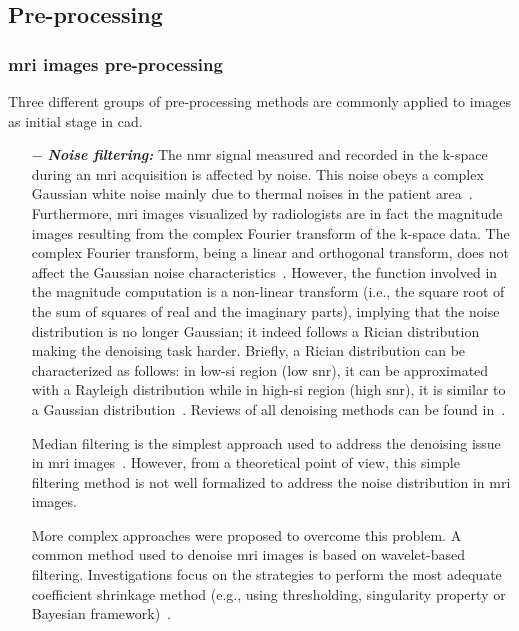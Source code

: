 \subsection{Pre-processing} \label{subsec:preprocessing}

\subsubsection{\ac{mri} images pre-processing}

Three different groups of pre-processing methods are commonly applied to images as initial stage in \ac{cad}.

\begin{enumerate}[leftmargin=*]

\item[$-$] \textbf{\textit{Noise filtering:}} The \ac{nmr} signal measured and recorded in the k-space during an \ac{mri} acquisition is affected by noise. This noise obeys a complex Gaussian white noise mainly due to thermal noises in the patient area~\cite{Nowak1999}. Furthermore, \ac{mri} images visualized by radiologists are in fact the magnitude images resulting from the complex Fourier transform of the k-space data. The complex Fourier transform, being a linear and orthogonal transform, does not affect the Gaussian noise characteristics~\cite{Nowak1999}. However, the function involved in the magnitude computation is a non-linear transform (i.e., the square root of the sum of squares of real and the imaginary parts), implying that the noise distribution is no longer Gaussian; it indeed follows a Rician distribution making the denoising task harder. Briefly, a Rician distribution can be characterized as follows: in low-\ac{si} region (low \ac{snr}), it can be approximated with a Rayleigh distribution while in high-\ac{si} region (high \ac{snr}), it is similar to a Gaussian distribution~\cite{Manjon2008}. Reviews of all denoising methods can be found in~\cite{Buades2005,Mohan2014}.

  Median filtering is the simplest approach used to address the denoising issue in \ac{mri} images~\cite{Ozer2009,Ozer2010}. However, from a theoretical point of view, this simple filtering method is not well formalized to address the noise distribution in \ac{mri} images.

  More complex approaches were proposed to overcome this problem. A common method used to denoise \ac{mri} images is based on wavelet-based filtering. Investigations focus on the strategies to perform the most adequate coefficient shrinkage method (e.g., using thresholding, singularity property or Bayesian framework)~\cite{Pizurica2002}.


\end{enumerate}
